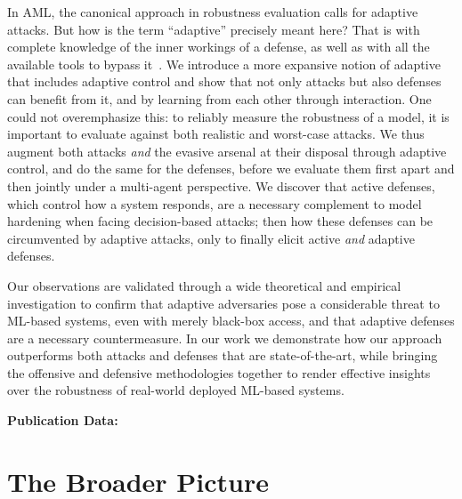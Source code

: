 In \gls{AML}, the canonical approach in robustness evaluation calls for adaptive attacks.
But how is the term ``adaptive'' precisely meant here?
That is with complete knowledge of the inner workings of a defense, as well as with all the available tools to bypass it~\cite{tramer2020adaptive}.
We introduce a more expansive notion of adaptive that includes adaptive control \cite{aastrom2013adaptive} and show that not only attacks but also defenses can benefit from it, and by learning from each other through interaction.
One could not overemphasize this: to reliably measure the robustness of a model, it is important to evaluate against both realistic and worst-case attacks.
We thus augment both attacks \emph{and} the evasive arsenal at their disposal through adaptive control, and do the same for the defenses, before we evaluate them first apart and then jointly under a multi-agent perspective.
We discover that active defenses, which control how a system responds, are a necessary complement to model hardening when facing decision-based attacks; then how these defenses can be circumvented by adaptive attacks, only to finally elicit active \emph{and} adaptive defenses.

Our observations are validated through a wide theoretical and empirical investigation to confirm that adaptive adversaries pose a considerable threat to ML-based systems, even with merely black-box access, and that adaptive defenses are a necessary countermeasure.
In our work we demonstrate how our approach outperforms both attacks and defenses that are state-of-the-art, while bringing the offensive and defensive methodologies together to render effective insights over the robustness of real-world deployed ML-based systems.

\textbf{Publication Data:} 

\section{The Broader Picture}

